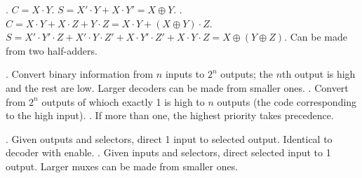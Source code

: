 \documentclass{slnotes}
\begin{document}
. \(C = X \cdot Y\). \(S = X' \cdot Y + X \cdot Y' = X \oplus Y\). . \(C = X \cdot Y + X \cdot Z + Y \cdot Z = X \cdot Y + (X \oplus Y) \cdot Z\). \(S = X' \cdot Y' \cdot Z + X' \cdot Y \cdot Z' + X \cdot Y' \cdot Z' + X \cdot Y \cdot Z = X \oplus (Y \oplus Z)\). Can be made from two half-adders.

. Convert binary information from \(n\) inputs to \(2^n\) outputs; the \(n\)th output is high and the rest are low. Larger decoders can be made from smaller ones. . Convert from \(2^n\) outputs of whioch exactly 1 is high to \(n\) outputs (the code corresponding to the high input). . If more than one, the highest priority takes precedence.

. Given outputs and selectors, direct 1 input to selected output. Identical to decoder with enable. . Given inputs and selectors, direct selected input to 1 output. Larger muxes can be made from smaller ones.
\end{document}
